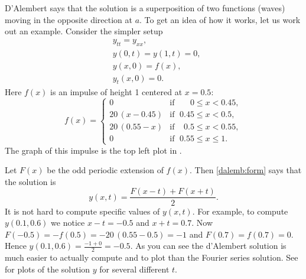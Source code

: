 \begin{example} \label{dalemb:implusexample}
D'Alembert says that the solution is a superposition of
two functions (waves) moving in the opposite direction at  $a$.
To get an idea of
how it works, let us work out an example.  Consider the simpler setup
\begin{align*}
& y_{tt} = y_{xx} , \\
& y(0,t) = y(1,t) = 0 , \\
& y(x,0) = f(x) , \\
& y_t(x,0) = 0 .
\end{align*}
Here $f(x)$ is an impulse of height 1 centered at $x=0.5$:
\begin{equation*}
f(x) =
\begin{cases}
0 & \text{if } \; \phantom{0.5}0 \leq x < 0.45, \\
20\,(x-0.45) & \text{if } \; 0.45 \leq x < 0.5, \\
20\,(0.55-x) & \text{if } \; \phantom{5}0.5 \leq x < 0.55, \\
0 & \text{if } \; 0.55 \leq x \leq 1 .
\end{cases}
\end{equation*}
The graph of this impulse is the top left plot in
.

Let $F(x)$ be the odd periodic extension of $f(x)$.  Then
\eqref{dalemb:form} says that
the solution is
\begin{equation*}
y(x,t) = \frac{F(x-t) + F(x+t)}{2} .
\end{equation*}
It is not hard to compute specific values of $y(x,t)$.  For example, to
compute $y(0.1,0.6)$ we notice $x-t = -0.5$ and $x+t = 0.7$.  Now $F(-0.5) =
-f(0.5) = - 20\,(0.55 - 0.5) = -1$
and $F(0.7) = f(0.7) = 0$.  Hence
$y(0.1,0.6) = \frac{-1 + 0}{2} = -0.5$.  As you can see the d'Alembert
solution is much easier to actually compute and to plot than the Fourier series
solution.  See  for plots of the solution $y$
for several different $t$.
\begin{myfig}
\capstart
\\[5pt]
\caption{Plot of the d'Alembert solution for $t=0$, $t=0.2$, $t=0.4$, and
$t=0.6$.%
\label{dalemb:impulsfig}}
\end{myfig}
\end{example}

